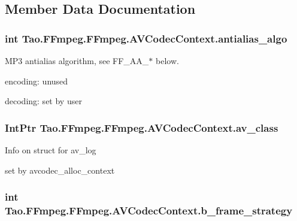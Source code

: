 \subsection{Member Data Documentation}
\hypertarget{struct_tao_1_1_f_fmpeg_1_1_f_fmpeg_1_1_a_v_codec_context_aa4d47b1e9e54329c794f3a90cc9f3600}{
\subsubsection[{antialias\_\-algo}]{\setlength{\rightskip}{0pt plus 5cm}int {\bf Tao.FFmpeg.FFmpeg.AVCodecContext.antialias\_\-algo}}}
\label{struct_tao_1_1_f_fmpeg_1_1_f_fmpeg_1_1_a_v_codec_context_aa4d47b1e9e54329c794f3a90cc9f3600}
MP3 antialias algorithm, see FF\_\-AA\_\-$\ast$ below.
\begin{DoxyItemize}
\item encoding: unused
\item decoding: set by user 
\end{DoxyItemize}\hypertarget{struct_tao_1_1_f_fmpeg_1_1_f_fmpeg_1_1_a_v_codec_context_aea01af6a02e45ca86b2e3efb1592cca5}{
\subsubsection[{av\_\-class}]{\setlength{\rightskip}{0pt plus 5cm}IntPtr {\bf Tao.FFmpeg.FFmpeg.AVCodecContext.av\_\-class}}}
\label{struct_tao_1_1_f_fmpeg_1_1_f_fmpeg_1_1_a_v_codec_context_aea01af6a02e45ca86b2e3efb1592cca5}
Info on struct for av\_\-log
\begin{DoxyItemize}
\item set by avcodec\_\-alloc\_\-context 
\end{DoxyItemize}\hypertarget{struct_tao_1_1_f_fmpeg_1_1_f_fmpeg_1_1_a_v_codec_context_adccd5dbdfadc27b53529a93d1b99cbaa}{
\subsubsection[{b\_\-frame\_\-strategy}]{\setlength{\rightskip}{0pt plus 5cm}int {\bf Tao.FFmpeg.FFmpeg.AVCodecContext.b\_\-frame\_\-strategy}}}
